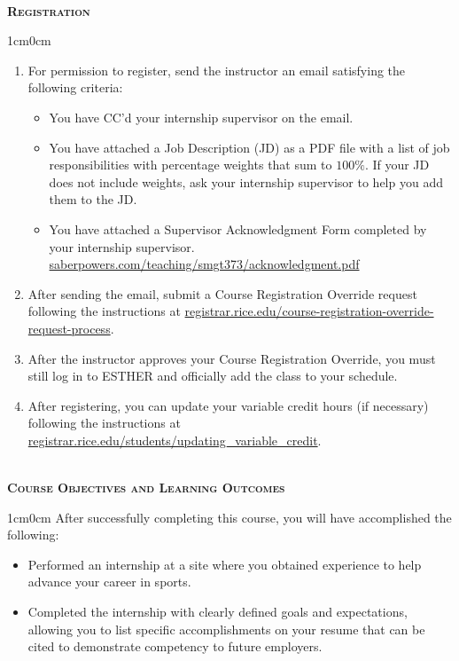 \documentclass[11pt]{article}
\begin{document}
~\\
\textbf{\textsc{Registration}}
\begin{adjustwidth}{1cm}{0cm}
  \begin{enumerate}
  \item For permission to register, send the instructor an email satisfying the following criteria:
  \begin{itemize}
    \item You have CC'd your internship supervisor on the email.
    \item You have attached a Job Description (JD) as a PDF file with a list of job responsibilities with percentage weights that sum to $100\%$. If your JD does not include weights, ask your internship supervisor to help you add them to the JD.
    \item You have attached a Supervisor Acknowledgment Form completed by your internship supervisor. \href{https://saberpowers.com/teaching/smgt373/acknowledgment.pdf}{saberpowers.com/teaching/smgt373/acknowledgment.pdf}
  \end{itemize}

  \item After sending the email, submit a Course Registration Override request following the instructions at \href{https://registrar.rice.edu/course-registration-override-request-process}{registrar.rice.edu/course-registration-override-request-process}.

  \item After the instructor approves your Course Registration Override, you must still log in to ESTHER and officially add the class to your schedule.

  \item After registering, you can update your variable credit hours (if necessary) following the instructions at \href{https://registrar.rice.edu/students/updating_variable_credit}{registrar.rice.edu/students/updating\_variable\_credit}.
  \end{enumerate}
\end{adjustwidth}

~\\
\textbf{\textsc{Course Objectives and Learning Outcomes}}
\begin{adjustwidth}{1cm}{0cm}
  After successfully completing this course, you will have accomplished the following:
  \begin{itemize}
    \item Performed an internship at a site where you obtained experience to help advance your career in sports.
    \item Completed the internship with clearly defined goals and expectations, allowing you to list specific accomplishments on your resume that can be cited to demonstrate competency to future employers.
  \end{itemize}
\end{adjustwidth}
\end{document}
